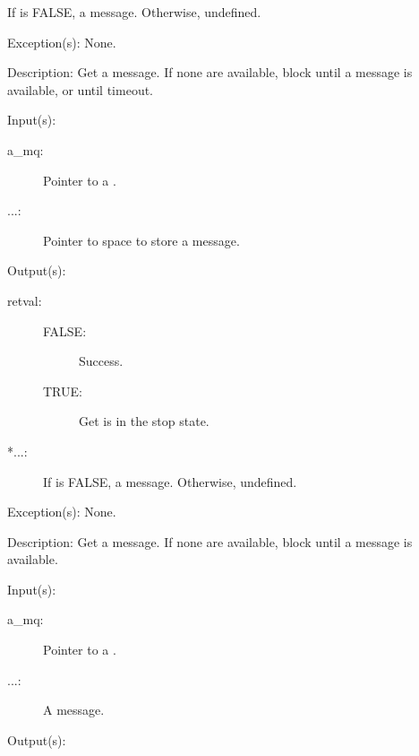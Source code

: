 \begin{capi}
\begin{capilist}
\begin{description}
			If  is FALSE, a message.  Otherwise,
			undefined.
		\end{description}
	\item[Exception(s): ] None.
	\item[Description: ]
		Get a message.  If none are available, block until a
		message is available, or until timeout.
	\end{capilist}
\label{mq_get}
	\begin{capilist}
	\item[Input(s): ]
		\begin{description}\item[]
		\item[a\_mq: ]
			Pointer to a .
		\item[...: ]
			Pointer to space to store a message.
		\end{description}
	\item[Output(s): ]
		\begin{description}\item[]
		\item[retval: ]
			\begin{description}\item[]
			\item[FALSE: ] Success.
			\item[TRUE: ] Get is in the stop state.
			\end{description}
		\item[*...: ]
			If  is FALSE, a message.  Otherwise,
			undefined.
		\end{description}
	\item[Exception(s): ] None.
	\item[Description: ]
		Get a message.  If none are available, block until a
		message is available.
	\end{capilist}
\label{mq_put}
	\begin{capilist}
	\item[Input(s): ]
		\begin{description}\item[]
		\item[a\_mq: ]
			Pointer to a \classname{mq}.
		\item[...: ]
			A message.
		\end{description}
	\item[Output(s): ]
		\begin{description}\item[]

\end{description}
\end{capilist}
\end{capi}
